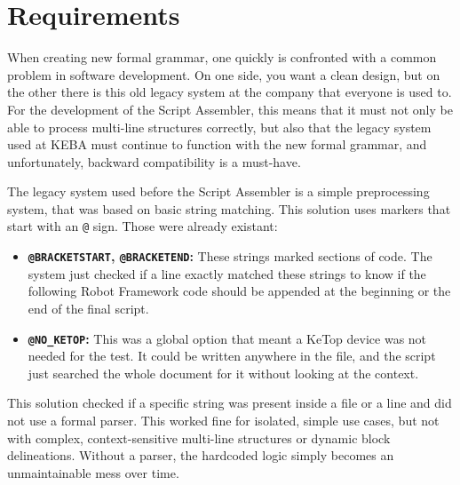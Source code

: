 
\section{Requirements}

When creating new formal grammar, one quickly is confronted with a common problem in software development. On one side, you want a clean design, but on the other there is this old legacy system at the company that everyone is used to. For the development of the Script Assembler, this means that it must not only be able to process multi-line structures correctly, but also that the legacy system used at KEBA must continue to function with the new formal grammar, and unfortunately, backward compatibility is a must-have.

The legacy system used before the Script Assembler is a simple preprocessing system, that was based on basic string matching. This solution uses markers that start with an \texttt{@} sign. Those were already existant:
\begin{itemize}
    \item \textbf{\texttt{@BRACKETSTART}, \texttt{@BRACKETEND}:} These strings marked sections of code. The system just checked if a line exactly matched these strings to know if the following Robot Framework code should be appended at the beginning or the end of the final script.
    \item \textbf{\texttt{@NO\_KETOP}:} This was a global option that meant a KeTop device was not needed for the test. It could be written anywhere in the file, and the script just searched the whole document for it without looking at the context.
\end{itemize}

This solution checked if a specific string was present inside a file or a line and did not use a formal parser. This worked fine for isolated, simple use cases, but not with complex, context-sensitive multi-line structures or dynamic block delineations. Without a parser, the hardcoded logic simply becomes an unmaintainable mess over time.

